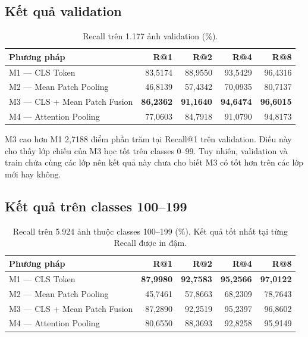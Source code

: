 \documentclass[11pt,a4paper]{article}
\begin{document}
\subsection{Kết quả validation}
\begin{table}[htbp]
\centering
\caption{Recall trên 1.177 ảnh validation (\%).}
\begin{tabular}{@{}lrrrr@{}}
\toprule
Phương pháp & R@1 & R@2 & R@4 & R@8\\
\midrule
M1 --- CLS Token & 83,5174 & 88,9550 & 93,5429 & 96,4316\\
M2 --- Mean Patch Pooling & 46,8139 & 57,4342 & 70,0935 & 80,7137\\
M3 --- CLS + Mean Patch Fusion & \textbf{86,2362} & \textbf{91,1640} & \textbf{94,6474} & \textbf{96,6015}\\
M4 --- Attention Pooling & 77,0603 & 84,7918 & 91,0790 & 94,8173\\
\bottomrule
\end{tabular}
\end{table}

M3 cao hơn M1 2,7188 điểm phần trăm tại Recall@1 trên validation. Điều này
cho thấy lớp chiếu của M3 học tốt trên classes 0--99. Tuy nhiên, validation
và train chứa cùng các lớp nên kết quả này chưa cho biết M3 có tốt hơn trên
các lớp mới hay không.

\subsection{Kết quả trên classes 100--199}
\begin{table}[htbp]
\centering
\caption{Recall trên 5.924 ảnh thuộc classes 100--199 (\%). Kết quả tốt nhất
tại từng Recall được in đậm.}
\begin{tabular}{@{}lrrrr@{}}
\toprule
Phương pháp & R@1 & R@2 & R@4 & R@8\\
\midrule
M1 --- CLS Token & \textbf{87,9980} & \textbf{92,7583} & \textbf{95,2566} & \textbf{97,0122}\\
M2 --- Mean Patch Pooling & 45,7461 & 57,8663 & 68,2309 & 78,7643\\
M3 --- CLS + Mean Patch Fusion & 87,2890 & 92,2519 & 95,2397 & 96,8602\\
M4 --- Attention Pooling & 80,6550 & 88,3693 & 92,8258 & 95,9149\\
\bottomrule
\end{tabular}
\end{table}
\end{document}
